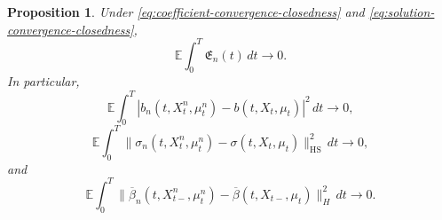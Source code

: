 \documentclass[12pt,oneside, reqno]{amsart}
\newtheorem{proposition}[theorem]{Proposition}
\numberwithin{equation}{section}
\begin{document}
	\begin{proposition}
		\label{prop:coefficient-integrand-convergence}
		Under
		\eqref{eq:coefficient-convergence-closedness} and
		\eqref{eq:solution-convergence-closedness},
		\begin{equation}
			\label{eq:coefficient-integrand-L2-convergence}
			\mathbb E\int_0^T\mathfrak E_n(t)\,dt
			\longrightarrow0.
		\end{equation}
		In particular,
		\begin{equation}
			\label{eq:drift-integrand-L2}
			\mathbb E\int_0^T
			|b_n(t,X_t^n,\mu_t^n)-b(t,X_t,\mu_t)|^2\,dt
			\longrightarrow0,
		\end{equation}
		\begin{equation}
			\label{eq:diffusion-integrand-L2}
			\mathbb E\int_0^T
			\|\sigma_n(t,X_t^n,\mu_t^n)
			-\sigma(t,X_t,\mu_t)\|_{\mathrm{HS}}^2\,dt
			\longrightarrow0,
		\end{equation}
		and
		\begin{equation}
			\label{eq:jump-integrand-L2}
			\mathbb E\int_0^T
			\|\overline\beta_n(t,X_{t-}^n,\mu_t^n)
			-\overline\beta(t,X_{t-},\mu_t)\|_H^2\,dt
			\longrightarrow0.
		\end{equation}
	\end{proposition}
	
\end{document}
